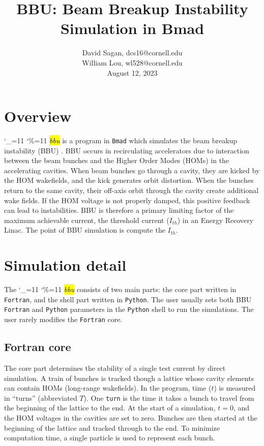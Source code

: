 \documentclass{hitec}
\title{BBU: Beam Breakup Instability Simulation in Bmad}
\author{}
\date{David Sagan, dcs16@cornell.edu \\
William Lou, wl528@cornell.edu \\
August 12, 2023}
\newcommand\dottcmd[1]{\hl{\em#1}\endgroup}
\newcommand{\vn}{\begingroup\catcode`\_=11 \catcode`\%=11 \dottcmd}
\newcommand{\bbu}{\vn{bbu}\xspace}
\begin{document}
\maketitle

\section{Overview}

\bbu is a program in \texttt{Bmad} which simulates the beam breakup instability (BBU) \cite{Bmad}. BBU occurs in recirculating accelerators due to interaction between the beam bunches and the Higher Order Modes (HOMs) in the accelerating cavities. When beam bunches go through a cavity, they are kicked by the HOM wakefields, and the kick generates orbit distortion. When the bunches return to the same cavity, their off-axis orbit through the cavity create additional wake fields. If the HOM voltage is not properly damped, this positive feedback can lead to instabilities. BBU is therefore a primary limiting factor of the maximum achievable current, the threshold current ($I_{th}$) in an Energy Recovery Linac. The point of BBU simulation is compute the $I_{th}$.

\section{Simulation detail}

The \bbu consists of two main parts: the core part written in \texttt{Fortran}, and the shell part written in \texttt{Python}. The user usually sets both BBU \texttt{Fortran} and \texttt{Python} parameters in the \texttt{Python} shell to run the simulations. The user rarely modifies the \texttt{Fortran} core. 

\subsection{Fortran core}
The core part determines the stability of a single test current by direct simulation. A train of bunches is tracked though a lattice whose cavity elements can contain HOMs (long-range wakefields). In the program, time ($t$) is measured in “turns” (abbreviated $T$). One \texttt{turn} is the time it
takes a bunch to travel from the beginning of the lattice to the end. At the start of a simulation, $t=0$, and the HOM voltages in the cavities are set to zero. Bunches are then started at
the beginning of the lattice and tracked through to the end. To minimize computation time, a single particle is used to represent each bunch.
\end{document}
